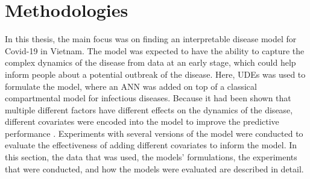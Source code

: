 \chapter{Methodologies}
\label{chap:methodologies}

In this thesis, the main focus was on finding an interpretable disease model for Covid-19 in Vietnam.
The model was expected to have the ability to capture the complex dynamics of the disease from data at an early stage, which could help inform people about a potential outbreak of the disease.
Here, \glspl{UDE} \cite{rackauckasUniversalDifferentialEquations2020} was used to formulate the model, where an \gls{ANN} was added on top of a classical compartmental model for infectious diseases.
Because it had been shown that multiple different factors have different effects on the dynamics of the disease, different covariates were encoded into the model to improve the predictive performance \cite{ihmecovid-19forecastingteamModelingCOVID19Scenarios2021,arikInterpretableSequenceLearning}.
Experiments with several versions of the model were conducted to evaluate the effectiveness of adding different covariates to inform the model.
In this section, the data that was used, the models' formulations, the experiments that were conducted, and how the models were evaluated are described in detail.












